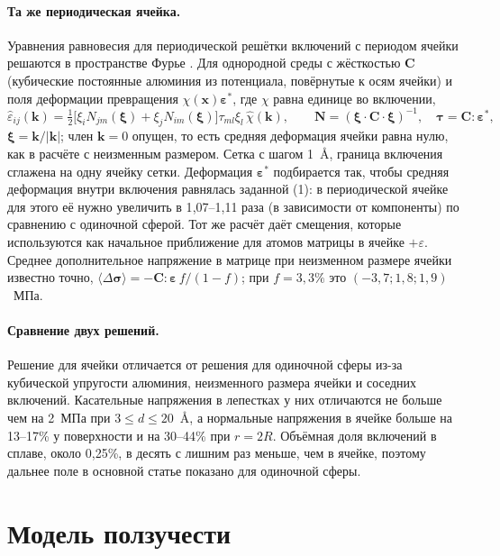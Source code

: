 \documentclass[11pt,a4paper]{article}
\begin{document}
\paragraph{Та же периодическая ячейка.} Уравнения равновесия
для периодической решётки включений с периодом ячейки решаются в пространстве
Фурье \cite{MoulinecSuquet1998}. Для однородной среды с жёсткостью
$\mathbf C$ (кубические постоянные алюминия из потенциала, повёрнутые
к осям ячейки) и поля деформации превращения $\chi(\mathbf x)
\boldsymbol\varepsilon^*$, где $\chi$ равна единице во включении,
\begin{equation}
\hat\varepsilon_{ij}(\mathbf k)=\tfrac12\bigl[\xi_iN_{jm}(\boldsymbol\xi)
+\xi_jN_{im}(\boldsymbol\xi)\bigr]\tau_{ml}\xi_l\,\hat\chi(\mathbf k),
\qquad \mathbf N=(\boldsymbol\xi\cdot\mathbf C\cdot\boldsymbol\xi)^{-1},
\quad \boldsymbol\tau=\mathbf C:\boldsymbol\varepsilon^*,
\end{equation}
$\boldsymbol\xi=\mathbf k/|\mathbf k|$; член $\mathbf k=0$ опущен, то есть
средняя деформация ячейки равна нулю, как в расчёте с неизменным размером.
Сетка с шагом 1~\AA{}, граница включения сглажена на одну ячейку сетки.
Деформация $\boldsymbol\varepsilon^*$ подбирается так, чтобы средняя
деформация внутри включения равнялась заданной (1): в периодической ячейке
для этого её нужно увеличить в 1{,}07--1{,}11 раза (в зависимости
от компоненты) по сравнению с одиночной сферой.
Тот же расчёт даёт смещения, которые используются как начальное
приближение для атомов матрицы в ячейке $+\varepsilon$. Среднее
дополнительное напряжение в матрице при неизменном размере ячейки известно
точно, $\langle\Delta\boldsymbol\sigma\rangle=-\mathbf C:\boldsymbol\varepsilon\,
f/(1-f)$; при $f=3{,}3\%$ это $(-3{,}7; 1{,}8; 1{,}9)$~МПа.

\paragraph{Сравнение двух решений.} Решение для ячейки отличается от
решения для одиночной сферы из-за кубической упругости алюминия,
неизменного размера ячейки и соседних включений. Касательные напряжения
в лепестках у них отличаются не больше чем на 2~МПа при
$3\le d\le20$~\AA, а нормальные напряжения в ячейке больше на 13--17\%
у поверхности и на 30--44\% при $r=2R$. Объёмная доля включений в сплаве,
около 0{,}25\%, в десять с лишним раз меньше, чем в ячейке, поэтому
дальнее поле в основной статье показано для одиночной сферы.

\section{Модель ползучести}
\end{document}
